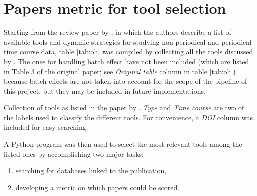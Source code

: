 \section{Papers metric for tool selection}\label{papers_metric}
Starting from the review paper by \citeauthor{ohTemporalDynamicMethods2021}, in which the authors describe a list of available tools and dynamic strategies for studying non-periodical and periodical time course data, table \ref{tab:oh} was compiled by collecting all the tools discussed by \citeauthor{ohTemporalDynamicMethods2021}. The ones for handling batch effect have not been included (which are listed in Table 3 of the original paper; see \emph{Original table} column in table \ref{tab:oh}) because batch effects are not taken into account for the scope of the pipeline of this project, but they may be included in future implementations.

\begin{table}[!ht]
    \centering\footnotesize
    
    \caption[Collection of tools as listed in the paper by ]{Collection of tools as listed in the paper by \citet{ohTemporalDynamicMethods2021}. \emph{Type} and \emph{Time course} are two of the labels used to classify the different tools. For convenience, a \emph{DOI} column was included for easy searching.}
    \label{tab:oh}
\end{table}

A Python program was then used to select the most relevant tools among the listed ones by accomplishing two major tasks:
\begin{enumerate}
    \item searching for databases linked to the publication,
    \item developing a metric on which papers could be scored.
\end{enumerate}


